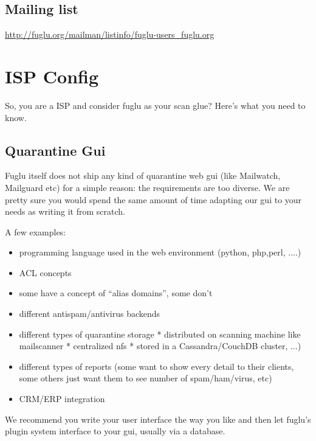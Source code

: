 \documentclass[letterpaper,10pt,english]{sphinxmanual}
\begin{document}
\section{Mailing list}
\label{help-index:mailing-list}
\href{http://fuglu.org/mailman/listinfo/fuglu-users\_fuglu.org}{http://fuglu.org/mailman/listinfo/fuglu-users\_fuglu.org}


\chapter{ISP Config}
\label{isp-config::doc}\label{isp-config:isp-config}
So, you are a ISP and consider fuglu as your scan glue? Here's what you need to know.


\section{Quarantine Gui}
\label{isp-config:quarantine-gui}
Fuglu itself does not ship any kind of quarantine web gui (like Mailwatch, Mailguard etc) for a simple reason: the requirements are too diverse. We are pretty sure you would spend the same amount of time adapting our gui to your needs as writing it from scratch.

A few examples:
\begin{itemize}
\item {} 
programming language used in the web environment (python, php,perl, ....)

\item {} 
ACL concepts

\item {} 
some have a concept of ``alias domains'', some don't

\item {} 
different antispam/antivirus backends

\item {} 
different types of quarantine storage
* distributed on scanning machine like mailscanner
* centralized nfs
* stored in a Cassandra/CouchDB cluster, ...)

\item {} 
different types of reports (some want to show every detail to their clients, some others just want them to see number of  spam/ham/virus, etc)

\item {} 
CRM/ERP integration

\end{itemize}

We recommend you write your user interface the way you like and then let fuglu's plugin system interface to your gui, usually via a database.
\end{document}
